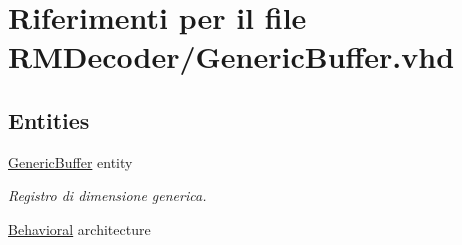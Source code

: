 \hypertarget{_generic_buffer_8vhd}{\section{Riferimenti per il file R\+M\+Decoder/\+Generic\+Buffer.vhd}
\label{_generic_buffer_8vhd}
}
\subsection*{Entities}
\begin{DoxyCompactItemize}
\item 
\hyperlink{class_generic_buffer}{Generic\+Buffer} entity
\begin{DoxyCompactList}\small\item\em Registro di dimensione generica. \end{DoxyCompactList}\item 
\hyperlink{class_generic_buffer_1_1_behavioral}{Behavioral} architecture
\end{DoxyCompactItemize}
